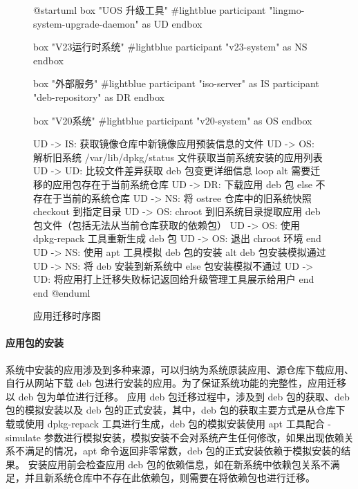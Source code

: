 \documentclass{utart}
\begin{document}
\begin{figure}[H]
    \centering
    \begin{plantuml}
        @startuml
        box "UOS 升级工具" #lightblue
        participant "lingmo-system-upgrade-daemon" as UD                             
        endbox

        box "V23运行时系统" #lightblue
        participant "v23-system" as NS
        endbox
        
        box "外部服务" #lightblue
        participant "iso-server" as IS
        participant "deb-repository" as DR
        endbox

        box "V20系统" #lightblue
        participant "v20-system" as OS
        endbox

        UD -> IS: 获取镜像仓库中新镜像应用预装信息的文件
        UD -> OS: 解析旧系统 /var/lib/dpkg/status 文件获取当前系统安装的应用列表
        UD -> UD: 比较文件差异获取 deb 包变更详细信息
        loop
        alt 需要迁移的应用包存在于当前系统仓库
        UD -> DR: 下载应用 deb 包
        else 不存在于当前的系统仓库
        UD -> NS: 将 ostree 仓库中的旧系统快照 checkout 到指定目录
        UD -> OS: chroot 到旧系统目录提取应用 deb 包文件（包括无法从当前仓库获取的依赖包）
        UD -> OS: 使用 dpkg-repack 工具重新生成 deb 包
        UD -> OS: 退出 chroot 环境
        end
        UD -> NS: 使用 apt 工具模拟 deb 包的安装
        alt deb 包安装模拟通过 
        UD -> NS: 将 deb 安装到新系统中
        else 包安装模拟不通过
        UD -> UD: 将应用打上迁移失败标记返回给升级管理工具展示给用户
        end
        end
        @enduml
    \end{plantuml}
    \caption{应用迁移时序图}
    \label{fig:appmig}
\end{figure}

\paragraph{应用包的安装}
系统中安装的应用涉及到多种来源，可以归纳为系统原装应用、源仓库下载应用、自行从网站下载 deb 包进行安装的应用。为了保证系统功能的完整性，应用迁移以 deb 包为单位进行迁移。
应用 deb 包迁移过程中，涉及到 deb 包的获取、deb 包的模拟安装以及 deb 包的正式安装，其中，deb 包的获取主要方式是从仓库下载或使用 dpkg-repack 工具进行生成，deb 包的模拟安装使用 apt 工具配合 -simulate 参数进行模拟安装，模拟安装不会对系统产生任何修改，如果出现依赖关系不满足的情况，apt 命令返回非零常数，deb 包的正式安装依赖于模拟安装的结果。
安装应用前会检查应用 deb 包的依赖信息，如在新系统中依赖包关系不满足，并且新系统仓库中不存在此依赖包，则需要在将依赖包也进行迁移。
\end{document}
